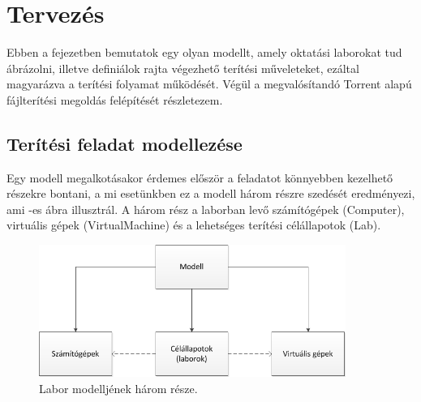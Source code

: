 \chapter{Tervezés}
\label{chp:design}
Ebben a fejezetben bemutatok egy olyan modellt, amely oktatási laborokat tud ábrázolni, illetve definiálok rajta végezhető terítési műveleteket, ezáltal magyarázva a terítési folyamat működését. Végül a megvalósítandó Torrent alapú fájlterítési megoldás felépítését részletezem.

\section{Terítési feladat modellezése}
\label{design_model}

Egy modell megalkotásakor érdemes először a feladatot könnyebben kezelhető részekre bontani, a mi esetünkben ez a modell három részre szedését eredményezi, ami -es ábra illusztrál. A három rész a laborban levő számítógépek (Computer), virtuális gépek (VirtualMachine) és a lehetséges terítési célállapotok (Lab).

\vspace{0.5cm}

\begin{figure}[ht]
	\centering
	\includegraphics[width=100mm, keepaspectratio]{figures/design_modelparts.png}
	\caption{Labor modelljének három része.}
	\label{fig:designmodelparts}
\end{figure}

\vspace{0.5cm}


